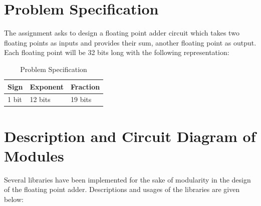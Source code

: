 \documentclass[12pt]{article}
\begin{document}
\section{\large{Problem Specification}}
The assignment asks to design a floating point adder circuit which takes two floating points as inputs and provides their sum, another floating point as output. Each floating point will be 32 bits long with the following representation:
\begin{table}[H]
    \centering
    \begin{tabular}{|p{3cm}|p{3cm}|p{3cm}|}
        \hline
         \large{\textbf{Sign}}&\large{\textbf{Exponent}}&\large{\textbf{Fraction}}  \\
         \hline
         {1 bit}&{12 bits}&{19 bits} \\
         \hline
    \end{tabular}
    \caption{Problem Specification}
    \label{tab:spec}
\end{table}
\newpage

\section{\large{Description and Circuit Diagram of Modules}}
Several libraries have been implemented for the sake of modularity in the design of the floating point adder. Descriptions and usages of the libraries are given below:
\end{document}
